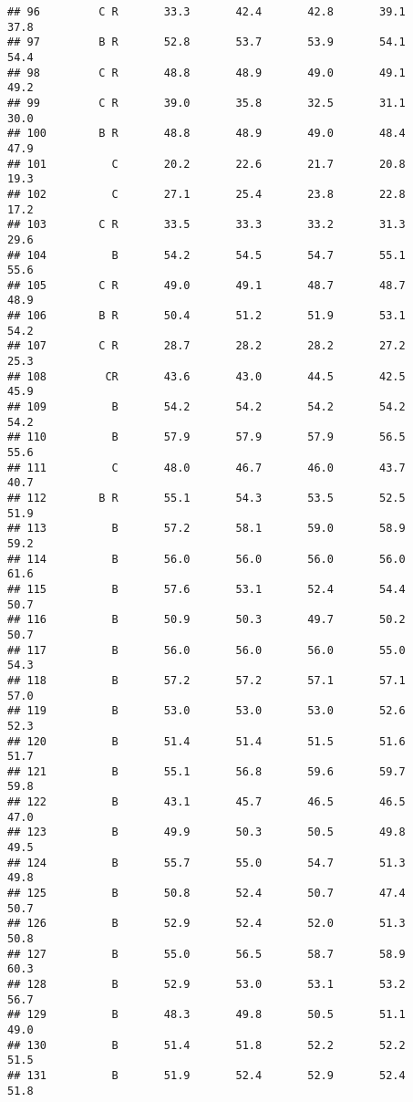\documentclass[]{article}
\begin{document}
\begin{verbatim}
## 96         C R       33.3       42.4       42.8       39.1       37.8
## 97         B R       52.8       53.7       53.9       54.1       54.4
## 98         C R       48.8       48.9       49.0       49.1       49.2
## 99         C R       39.0       35.8       32.5       31.1       30.0
## 100        B R       48.8       48.9       49.0       48.4       47.9
## 101          C       20.2       22.6       21.7       20.8       19.3
## 102          C       27.1       25.4       23.8       22.8       17.2
## 103        C R       33.5       33.3       33.2       31.3       29.6
## 104          B       54.2       54.5       54.7       55.1       55.6
## 105        C R       49.0       49.1       48.7       48.7       48.9
## 106        B R       50.4       51.2       51.9       53.1       54.2
## 107        C R       28.7       28.2       28.2       27.2       25.3
## 108         CR       43.6       43.0       44.5       42.5       45.9
## 109          B       54.2       54.2       54.2       54.2       54.2
## 110          B       57.9       57.9       57.9       56.5       55.6
## 111          C       48.0       46.7       46.0       43.7       40.7
## 112        B R       55.1       54.3       53.5       52.5       51.9
## 113          B       57.2       58.1       59.0       58.9       59.2
## 114          B       56.0       56.0       56.0       56.0       61.6
## 115          B       57.6       53.1       52.4       54.4       50.7
## 116          B       50.9       50.3       49.7       50.2       50.7
## 117          B       56.0       56.0       56.0       55.0       54.3
## 118          B       57.2       57.2       57.1       57.1       57.0
## 119          B       53.0       53.0       53.0       52.6       52.3
## 120          B       51.4       51.4       51.5       51.6       51.7
## 121          B       55.1       56.8       59.6       59.7       59.8
## 122          B       43.1       45.7       46.5       46.5       47.0
## 123          B       49.9       50.3       50.5       49.8       49.5
## 124          B       55.7       55.0       54.7       51.3       49.8
## 125          B       50.8       52.4       50.7       47.4       50.7
## 126          B       52.9       52.4       52.0       51.3       50.8
## 127          B       55.0       56.5       58.7       58.9       60.3
## 128          B       52.9       53.0       53.1       53.2       56.7
## 129          B       48.3       49.8       50.5       51.1       49.0
## 130          B       51.4       51.8       52.2       52.2       51.5
## 131          B       51.9       52.4       52.9       52.4       51.8

\end{verbatim}
\end{document}
